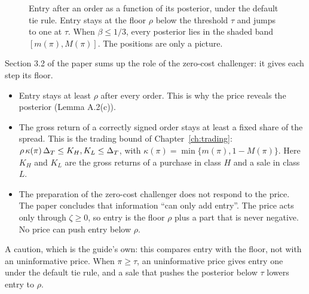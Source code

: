 \begin{figure}[ht]
\centering
{}
\caption{Entry after an order as a function of its posterior, under the default tie rule. Entry stays at the floor \(\rho\) below the threshold \(\tau\) and jumps to one at \(\tau\). When \(\beta\le1/3\), every posterior lies in the shaded band \([m(\pi),M(\pi)]\). The positions are only a picture.}
\label{fig:beliefs-entry}
\end{figure}

Section 3.2 of the paper sums up the role of the zero-cost challenger: it gives each step its floor.
\begin{itemize}
\item Entry stays at least \(\rho\) after every order. This is why the price reveals the posterior (Lemma A.2(c)).
\item The gross return of a correctly signed order stays at least a fixed share of the spread. This is the trading bound of Chapter~\ref{ch:trading}: \(\rho\,\kappa(\pi)\,\Delta_T\le K_H,K_L\le\Delta_T\), with \(\kappa(\pi)=\min\{m(\pi),1-M(\pi)\}\). Here \(K_H\) and \(K_L\) are the gross returns of a purchase in class \(H\) and a sale in class \(L\).
\item The preparation of the zero-cost challenger does not respond to the price. The paper concludes that information ``can only add entry''. The price acts only through \(\zeta\ge0\), so entry is the floor \(\rho\) plus a part that is never negative. No price can push entry below \(\rho\).
\end{itemize}
A caution, which is the guide's own: this compares entry with the floor, not with an uninformative price. When \(\pi\ge\tau\), an uninformative price gives entry one under the default tie rule, and a sale that pushes the posterior below \(\tau\) lowers entry to \(\rho\).

